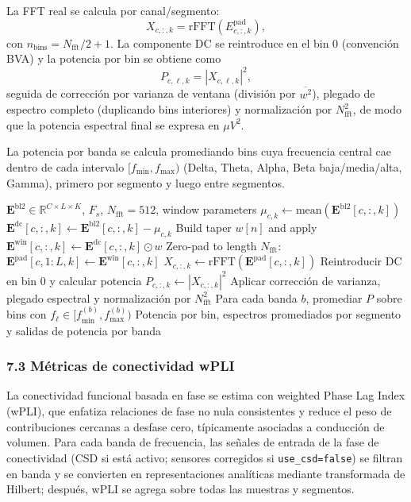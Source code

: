 La FFT real se calcula por canal/segmento:
\[
X_{c,:,k}=\mathrm{rFFT}\!\left(E^{\mathrm{pad}}_{c,:,k}\right),
\]
con $n_{\mathrm{bins}}=N_{\mathrm{fft}}/2+1$. La componente DC se reintroduce en el bin 0 (convención BVA) y la potencia por bin se obtiene como
\[
P_{c,\ell,k}=|X_{c,\ell,k}|^2,
\]
seguida de corrección por varianza de ventana (división por $\overline{w^2}$), plegado de espectro completo (duplicando bins interiores) y normalización por $N_{\mathrm{fft}}^2$, de modo que la potencia espectral final se expresa en $\mu V^2$.

La potencia por banda se calcula promediando bins cuya frecuencia central cae dentro de cada intervalo $[f_{\min},f_{\max})$ (Delta, Theta, Alpha, Beta baja/media/alta, Gamma), primero por segmento y luego entre segmentos.

\begin{algorithm}[H]
\caption{Análisis espectral mediante FFT (como en \texttt{FFT.jl})}
\begin{algorithmic}
\Require $\mathbf{E}^{\mathrm{bl2}}\in\mathbb{R}^{C\times L\times K}$, $F_s$, $N_{\mathrm{fft}}=512$, window parameters
    \State $\mu_{c,k}\gets \mathrm{mean}(\mathbf{E}^{\mathrm{bl2}}[c,:,k])$
    \State $\mathbf{E}^{\mathrm{dc}}[c,:,k]\gets \mathbf{E}^{\mathrm{bl2}}[c,:,k]-\mu_{c,k}$
    \State Build taper $w[n]$ and apply $\mathbf{E}^{\mathrm{win}}[c,:,k]\gets \mathbf{E}^{\mathrm{dc}}[c,:,k]\odot w$
    \State Zero-pad to length $N_{\mathrm{fft}}$: $\mathbf{E}^{\mathrm{pad}}[c,1\!:\!L,k]\gets \mathbf{E}^{\mathrm{win}}[c,:,k]$
    \State $X_{c,:,k}\gets \mathrm{rFFT}(\mathbf{E}^{\mathrm{pad}}[c,:,k])$
    \State Reintroducir DC en bin 0 y calcular potencia $P_{c,:,k}\gets |X_{c,:,k}|^2$
    \State Aplicar corrección de varianza, plegado espectral y normalización por $N_{\mathrm{fft}}^2$
  \EndFor
\EndFor
\State Para cada banda $b$, promediar $P$ sobre bins con $f_\ell\in[f_{\min}^{(b)},f_{\max}^{(b)})$
\Ensure Potencia por bin, espectros promediados por segmento y salidas de potencia por banda
\end{algorithmic}
\end{algorithm}

\subsubsection*{7.3 Métricas de conectividad wPLI}
La conectividad funcional basada en fase se estima con weighted Phase Lag Index (wPLI), que enfatiza relaciones de fase no nula consistentes y reduce el peso de contribuciones cercanas a desfase cero, típicamente asociadas a conducción de volumen. Para cada banda de frecuencia, las señales de entrada de la fase de conectividad (CSD si está activo; sensores corregidos si \texttt{use\_csd=false}) se filtran en banda y se convierten en representaciones analíticas mediante transformada de Hilbert; después, wPLI se agrega sobre todas las muestras y segmentos.

